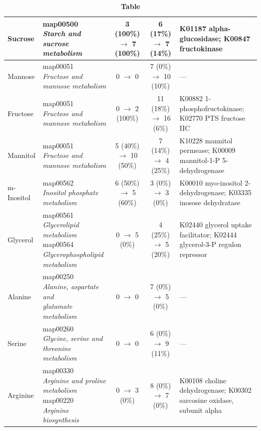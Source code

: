 \begin{table}[!h]
{\begin{tabular}{|l|l|c|c|p{4.6cm}|}
\hline
Sucrose & \makecell[l]{map00500 \\ \textit{Starch and sucrose metabolism}} & 3 (100\%) $\rightarrow$ 7 (100\%) & 6 (17\%) $\rightarrow$ 7 (14\%) & K01187 alpha-glucosidase; K00847 fructokinase \\
\hline
Mannose & \makecell[l]{map00051 \\ \textit{Fructose and mannose metabolism}} & 0 $\rightarrow$ 0 & 7 (0\%) $\rightarrow$ 10 (10\%) & --- \\
\hline
Fructose & \makecell[l]{map00051 \\ \textit{Fructose and mannose metabolism}} & 0 $\rightarrow$ 2 (100\%) & 11 (18\%) $\rightarrow$ 16 (6\%) & K00882 1-phosphofructokinase; K02770 PTS fructose IIC \\
\hline
Mannitol & \makecell[l]{map00051 \\ \textit{Fructose and mannose metabolism}} & 5 (40\%) $\rightarrow$ 10 (50\%) & 7 (14\%) $\rightarrow$ 4 (25\%) & K10228 mannitol permease; K00009 mannitol-1-P 5-dehydrogenase \\
\hline
m-Inositol & \makecell[l]{map00562 \\ \textit{Inositol phosphate metabolism}} & 6 (50\%) $\rightarrow$ 5 (60\%) & 3 (0\%) $\rightarrow$ 3 (0\%) & K00010 myo-inositol 2-dehydrogenase; K03335 inosose dehydratase \\
\hline
Glycerol & \makecell[l]{map00561 \\ \textit{Glycerolipid metabolism} \\[2pt] map00564 \\ \textit{Glycerophospholipid metabolism}} & 0 $\rightarrow$ 5 (0\%) & 4 (25\%) $\rightarrow$ 5 (20\%) & K02440 glycerol uptake facilitator; K02444 glycerol-3-P regulon repressor \\
\hline
Alanine & \makecell[l]{map00250 \\ \textit{Alanine, aspartate and} \\ \textit{glutamate metabolism}} & 0 $\rightarrow$ 0 & 7 (0\%) $\rightarrow$ 5 (0\%) & --- \\
\hline
Serine & \makecell[l]{map00260 \\ \textit{Glycine, serine and} \\ \textit{threonine metabolism}} & 0 $\rightarrow$ 0 & 6 (0\%) $\rightarrow$ 9 (11\%) & --- \\
\hline
Arginine & \makecell[l]{map00330 \\ \textit{Arginine and proline metabolism} \\[2pt] map00220 \\ \textit{Arginine biosynthesis}} & 0 $\rightarrow$ 3 (0\%) & 8 (0\%) $\rightarrow$ 7 (0\%) & K00108 choline dehydrogenase; K00302 sarcosine oxidase, subunit alpha \\
\hline
\end{tabular}%
}
\caption*{\textbf{Table }}
\end{table}
